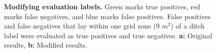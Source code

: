 \documentclass[11pt, review]{elsarticle} %
\begin{document}
\begin{figure} [!htb]
    \centering
    \hspace{5pt}
    \caption{\textbf{Modifying evaluation labels.} Green marks true positives, red marks false negatives, and blue marks false positives. False positives and false negatives that lay within one grid zone (9 $m^2$) of a ditch label were evaluated as true positives and true negatives. \textbf{a:} Original results, \textbf{b:} Modified results. }
    \label{fig:newlabels}
\end{figure}
\end{document}
